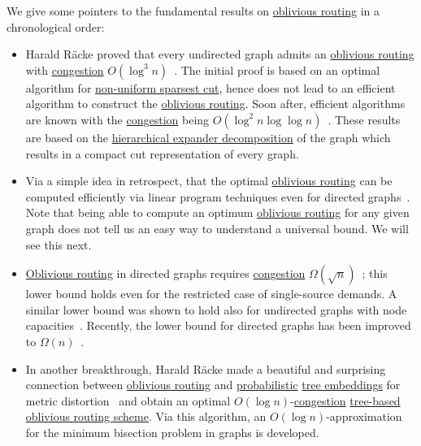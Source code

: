 We give some pointers to the fundamental results on \hyperref[prb:oblivious-routing]{oblivious routing} in a chronological order:
\begin{itemize}
	\item Harald Räcke proved that every undirected graph admits an \hyperref[def:oblivious-routing-scheme]{oblivious routing} with \hyperref[def:congestion-of-oblivious-routing]{congestion} \(O(\log ^3 n)\)~\cite{racke2002minimizing}. The initial proof is based on an optimal algorithm for \hyperref[prb:non-uniform-sparsest-cut]{non-uniform sparsest cut}, hence does not lead to an efficient algorithm to construct the \hyperref[def:oblivious-routing-scheme]{oblivious routing}. Soon after, efficient algorithms are known with the \hyperref[def:congestion-of-oblivious-routing]{congestion} being \(O(\log ^2 n \log \log n)\)~\cite{bienkowski2003practical,harrelson2003polynomial}. These results are based on the \hyperref[thm:hierarchical-expander-decomposition]{hierarchical expander decomposition} of the graph which results in a compact cut representation of every graph.
	\item Via a simple idea in retrospect, that the optimal \hyperref[def:oblivious-routing-scheme]{oblivious routing} can be computed efficiently via linear program techniques even for directed graphs~\cite{azar2003optimal}. Note that being able to compute an optimum \hyperref[def:oblivious-routing-scheme]{oblivious routing} for any given graph does not tell us an easy way to understand a universal bound. We will see this next.
	\item \hyperref[def:oblivious-routing-scheme]{Oblivious routing} in directed graphs requires \hyperref[def:congestion-of-oblivious-routing]{congestion} \(\Omega (\sqrt{n} )\)~\cite{azar2003optimal}; this lower bound holds even for the restricted case of single-source demands. A similar lower bound was shown to hold also for undirected graphs with node capacities~\cite{hajiaghayi2007oblivious}. Recently, the lower bound for directed graphs has been improved to \(\Omega (n)\)~\cite{ene2016routing}.
	\item In another breakthrough, Harald Räcke made a beautiful and surprising connection between \hyperref[def:oblivious-routing-scheme]{oblivious routing} and \hyperref[def:probabilistic-approximation]{probabilistic} \hyperref[prb:tree-embedding]{tree embeddings} for metric distortion~\cite{racke2008optimal} and obtain an optimal \(O(\log n)\)-\hyperref[def:congestion-of-oblivious-routing]{congestion} \hyperref[not:tree-based-oblivious-routing]{tree-based oblivious routing scheme}. Via this algorithm, an \(O(\log n)\)-approximation for the minimum bisection problem in graphs is developed.
\end{itemize}

